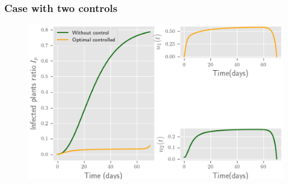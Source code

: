 \documentclass[10pt]{beamer}
\begin{document}
\begin{frame}
\frametitle{Case with two controls}
\begin{figure}
	\centering	
	\includegraphics[scale=0.5]{Feathergraphics/two_control_simulation_2.eps}
\end{figure}	
\end{frame}
\end{document}
